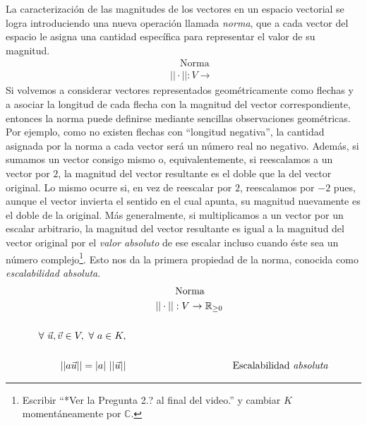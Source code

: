 \documentclass[12pt,dvipsnames]{article}
\numberwithin{equation}{section}
\begin{document}
La caracterización de las magnitudes de los vectores en un espacio vectorial se logra introduciendo una nueva operación llamada \emph{norma}, que a cada vector del espacio le asigna una cantidad específica para representar el valor de su magnitud. 
\begin{align*}
     & & &\quad \text{Norma}& \\
     & & &||\cdot||:V\to &
\end{align*}
Si volvemos a considerar vectores representados geométricamente como flechas y a asociar la longitud de cada flecha con la magnitud del vector correspondiente, entonces la norma puede definirse mediante sencillas observaciones geométricas. Por ejemplo, como no existen flechas con ``longitud negativa'', la cantidad asignada por la norma a cada vector será un número real no negativo. Además, si sumamos un vector consigo mismo \textemdash o, equivalentemente, si reescalamos a un vector por $2$\textemdash, la magnitud del vector resultante es el doble que la del vector original. Lo mismo ocurre si, en vez de reescalar por $2$, reescalamos por $-2$ pues, aunque el vector invierta el sentido en el cual apunta, su magnitud nuevamente es el doble de la original. Más generalmente, si multiplicamos a un vector por un escalar arbitrario, la magnitud del vector resultante es igual a la magnitud del vector original por el \emph{valor absoluto} de ese escalar \textemdash incluso cuando éste sea un número complejo\footnote{Escribir ``*Ver la Pregunta 2.? al final del video.'' y cambiar $K$ momentáneamente por $\mathbb{C}$.}. Esto nos da la primera propiedad de la norma, conocida como \emph{escalabilidad absoluta}. %
\begin{align*}
     &\quad \quad \quad \quad \quad \text{Norma}& \\
     &\quad \quad \quad ||\cdot||:V\to \mathbb{R}_{\ge0}& \\
     \\
     \forall \ \vec{u},\vec{v}\in V, \ \forall \ a\in K, \\
    \\
    ||a\vec{u}|| = |a| \ ||\vec{u}|| &&\text{Escalabilidad \emph{absoluta}} \\
\end{align*}
\end{document}
